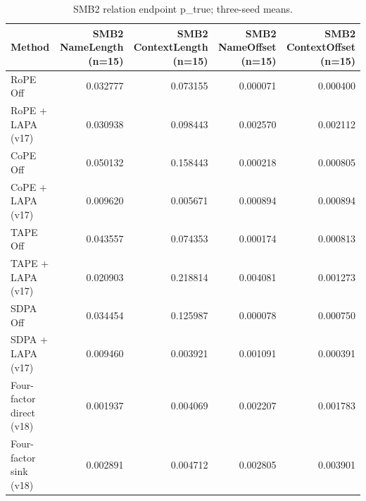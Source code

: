 \begin{table}[t]
\centering
\scriptsize
\caption{SMB2 relation endpoint p\_true; three-seed means.}
\begin{tabular}{lrrrr}
\toprule
Method & SMB2 NameLength (n=15) & SMB2 ContextLength (n=15) & SMB2 NameOffset (n=15) & SMB2 ContextOffset (n=15) \\
\midrule
RoPE Off & 0.032777 & 0.073155 & 0.000071 & 0.000400 \\
RoPE + LAPA (v17) & 0.030938 & 0.098443 & 0.002570 & 0.002112 \\
CoPE Off & 0.050132 & 0.158443 & 0.000218 & 0.000805 \\
CoPE + LAPA (v17) & 0.009620 & 0.005671 & 0.000894 & 0.000894 \\
TAPE Off & 0.043557 & 0.074353 & 0.000174 & 0.000813 \\
TAPE + LAPA (v17) & 0.020903 & 0.218814 & 0.004081 & 0.001273 \\
SDPA Off & 0.034454 & 0.125987 & 0.000078 & 0.000750 \\
SDPA + LAPA (v17) & 0.009460 & 0.003921 & 0.001091 & 0.000391 \\
Four-factor direct (v18) & 0.001937 & 0.004069 & 0.002207 & 0.001783 \\
Four-factor sink (v18) & 0.002891 & 0.004712 & 0.002805 & 0.003901 \\
\bottomrule
\end{tabular}
\end{table}
